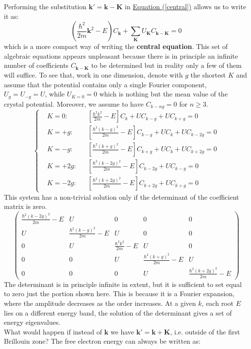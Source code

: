 \documentclass[10.75pt,a4paper,openright,bottom=2cm]{article}
\renewcommand{\Vec}[1]{\boldsymbol{#1}}
\begin{document}
\noindent Performing the substitution $\Vec{k'}=\Vec{k}-\Vec{K}$ in \hyperref[central]{Equation (\ref{central})} allows us to write it as:
\[
\left(\frac{\hbar^2}{2m}\Vec{k}^2-E\right)C_{\Vec{k}}+\sum_{\Vec{K}}U_{\Vec{K}}C_{\Vec{k}-\Vec{K}}=0
\]
which is a more compact way of writing the \textbf{central equation}. This set of algebraic equations appears unpleasant because there is in principle an infinite number of coefficients $C_{\Vec{k}-\Vec{K}}$ to be determined but in reality only a few of them will suffice. To see that, work in one dimension, denote with $g$ the shortest $K$ and assume that the potential contains only a single Fourier component, $U_g=U_{-g}=U$, while $U_{K=0}=0$ which is nothing but the mean value of the crystal potential. Moreover, we assume to have $C_{k-ng}=0$ for $n\ge3$.
\[
\left\{
\begin{aligned}
&K=0: &&\left[\frac{\hbar^2k^2}{2m}-E\right]C_k+UC_{k-g}+UC_{k+g}=0\\
&K=+g: &&\left[\frac{\hbar^2(k-g)^2}{2m}-E\right]C_{k-g}+UC_k+UC_{k-2g}=0\\
&K=-g: &&\left[\frac{\hbar^2(k+g)^2}{2m}-E\right]C_{k+g}+UC_k+UC_{k+2g}=0\\
&K=+2g: &&\left[\frac{\hbar^2(k-2g)^2}{2m}-E\right]C_{k-2g}+UC_{k-g}=0\\
&K=-2g: &&\left[\frac{\hbar^2(k+2g)^2}{2m}-E\right]C_{k+2g}+UC_{k+g}=0
\end{aligned}
\right.
\]
This system has a non-trivial solution only if the determinant of the coefficient matrix is zero.
\[
\left(\begin{array}{ccccc}
    \frac{\hbar^2(k-2g)^2}{2m}-E & U & 0 & 0 & 0 \\
    U & \frac{\hbar^2(k-g)^2}{2m}-E & U & 0 & 0 \\
    0 & U & \frac{\hbar^2k^2}{2m}-E & U & 0 \\
    0 & 0 & U & \frac{\hbar^2(k+g)^2}{2m}-E & U \\
    0 & 0 & 0 & U & \frac{\hbar^2(k+2g)^2}{2m}-E
\end{array}\right)
\]
The determinant is in principle infinite in extent, but it is sufficient to set equal to zero just the portion shown here. This is because it is a Fourier expansion, where the amplitude decreases as the order increases. At a given $k$, each root $E$ lies on a different energy band, the solution of the determinant gives a set of energy eigenvalues.\\
What would happen if instead of $\Vec{k}$ we have $\Vec{k'}=\Vec{k}+\Vec{K}$, i.e. outside of the first Brillouin zone? The free electron energy can always be written as:
\end{document}
